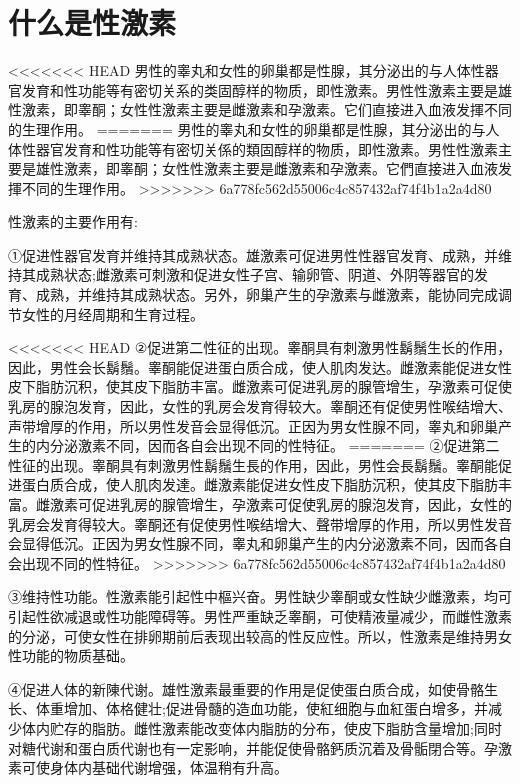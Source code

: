 \documentclass[12pt,UTF8]{ctexbook}
\begin{document}
\section{什么是性激素}

<<<<<<< HEAD
男性的睾丸和女性的卵巢都是性腺，其分泌出的与人体性器官发育和性功能等有密切关系的类固醇样的物质，即性激素。男性性激素主要是雄性激素，即睾酮；女性性激素主要是雌激素和孕激素。它们直接进入血液发揮不同的生理作用。
=======
男性的睾丸和女性的卵巢都是性腺，其分泌出的与人体性器官发育和性功能等有密切关係的類固醇样的物质，即性激素。男性性激素主要是雄性激素，即睾酮；女性性激素主要是雌激素和孕激素。它們直接进入血液发揮不同的生理作用。
>>>>>>> 6a778fc562d55006c4c857432af74f4b1a2a4d80

性激素的主要作用有:

①促进性器官发育并维持其成熟状态。雄激素可促进男性性器官发育、成熟，并维持其成熟状态;雌激素可刺激和促进女性子宫、输卵管、阴道、外阴等器官的发育、成熟，并维持其成熟状态。另外，卵巢产生的孕激素与雌激素，能协同完成调节女性的月经周期和生育过程。

<<<<<<< HEAD
②促进第二性征的出现。睾酮具有刺激男性鬍鬚生长的作用，因此，男性会长鬍鬚。睾酮能促进蛋白质合成，使人肌肉发达。雌激素能促进女性皮下脂肪沉积，使其皮下脂肪丰富。雌激素可促进乳房的腺管增生，孕激素可促使乳房的腺泡发育，因此，女性的乳房会发育得较大。睾酮还有促使男性喉结增大、声带增厚的作用，所以男性发音会显得低沉。正因为男女性腺不同，睾丸和卵巢产生的内分泌激素不同，因而各自会出现不同的性特征。
=======
②促进第二性征的出现。睾酮具有刺激男性鬍鬚生長的作用，因此，男性会長鬍鬚。睾酮能促进蛋白质合成，使人肌肉发達。雌激素能促进女性皮下脂肪沉积，使其皮下脂肪丰富。雌激素可促进乳房的腺管增生，孕激素可促使乳房的腺泡发育，因此，女性的乳房会发育得较大。睾酮还有促使男性喉结增大、聲带增厚的作用，所以男性发音会显得低沉。正因为男女性腺不同，睾丸和卵巢产生的内分泌激素不同，因而各自会出现不同的性特征。
>>>>>>> 6a778fc562d55006c4c857432af74f4b1a2a4d80

③维持性功能。性激素能引起性中樞兴奋。男性缺少睾酮或女性缺少雌激素，均可引起性欲减退或性功能障碍等。男性严重缺乏睾酮，可使精液量减少，而雌性激素的分泌，可使女性在排卵期前后表现出较高的性反应性。所以，性激素是维持男女性功能的物质基础。

④促进人体的新陳代谢。雄性激素最重要的作用是促使蛋白质合成，如使骨骼生长、体重增加、体格健壮;促进骨髓的造血功能，使紅细胞与血紅蛋白增多，并减少体内贮存的脂肪。雌性激素能改变体内脂肪的分布，使皮下脂肪含量增加;同时对糖代谢和蛋白质代谢也有一定影响，并能促使骨骼鈣质沉着及骨骺閉合等。孕激素可使身体内基础代谢增强，体温稍有升高。
\end{document}
